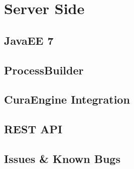 \chapter{Server Side}

\section{JavaEE 7}
\section{ProcessBuilder}
\section{CuraEngine Integration}
\section{REST API}
\section{Issues & Known Bugs}


